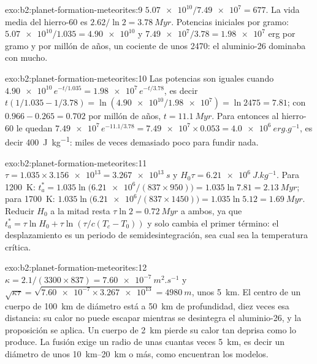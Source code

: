 \begin{solution}{exo:b2:planet-formation-meteorites:9}
$\num{5.07e10}/\num{7.49e7} = 677$. La vida media del hierro-60 es
$2.62/\ln2 = \qty{3.78}{Myr}$. Potencias iniciales por gramo:
$\num{5.07e10}/1.035 = \num{4.90e10}$ y $\num{7.49e7}/3.78 = \num{1.98e7}$ erg por
gramo y por millón de años, un cociente de unos \num{2470}: el aluminio-26 dominaba con mucho.
\end{solution}

\begin{solution}{exo:b2:planet-formation-meteorites:10}
Las potencias son iguales cuando $\num{4.90e10}\,e^{-t/1.035} = \num{1.98e7}\,e^{-t/3.78}$,
es decir $t(1/1.035 - 1/3.78) = \ln(\num{4.90e10}/\num{1.98e7}) = \ln 2475 = 7.81$;
con $0.966 - 0.265 = 0.702$ por millón de años, $t = \qty{11.1}{Myr}$. Para entonces al
hierro-60 le quedan $\num{7.49e7}\,e^{-11.1/3.78} = \num{7.49e7}\times0.053 =
\qty{4.0e6}{erg.g^{-1}}$, es decir \qty{400}{J.kg^{-1}}: miles de veces demasiado
poco para fundir nada.
\end{solution}

\begin{solution}{exo:b2:planet-formation-meteorites:11}
$\tau = 1.035\times\num{3.156e13} = \qty{3.267e13}{s}$ y
$H_0\tau = \qty{6.21e6}{J.kg^{-1}}$. Para \qty{1200}{K}:
$t_a^* = 1.035\ln\bigl(\num{6.21e6}/(837\times950)\bigr) = 1.035\ln7.81 =
\qty{2.13}{Myr}$; para \qty{1700}{K}: $1.035\ln\bigl(\num{6.21e6}/(837\times1450)\bigr)
= 1.035\ln5.12 = \qty{1.69}{Myr}$. Reducir $H_0$ a la mitad resta $\tau\ln2 =
\qty{0.72}{Myr}$ a ambos, ya que $t_a^* = \tau\ln H_0 + \tau\ln(\tau/c(T_c -
T_0))$ y solo cambia el primer término: el desplazamiento es un periodo de semidesintegración, sea cual sea la
temperatura crítica.
\end{solution}

\begin{solution}{exo:b2:planet-formation-meteorites:12}
$\kappa = 2.1/(3300\times837) = \qty{7.60e-7}{m^2.s^{-1}}$ y
$\sqrt{\kappa\tau} = \sqrt{\num{7.60e-7}\times\num{3.267e13}} = \qty{4980}{m}$,
unos \qty{5}{km}. El centro de un cuerpo de \qty{100}{km} de diámetro está a \qty{50}{km} de profundidad,
diez veces esa distancia: su calor no puede escapar mientras se desintegra el aluminio-26, y la
proposición se aplica. Un cuerpo de \qty{2}{km} pierde su calor tan deprisa como lo
produce. La fusión exige un radio de unas cuantas veces \qty{5}{km}, es decir un diámetro de unos
\qtyrange{10}{20}{km} o más, como encuentran los modelos.
\end{solution}

